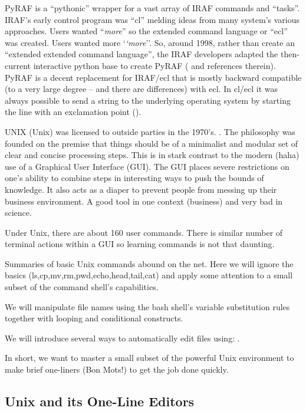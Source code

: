 PyRAF is a ``pythonic'' wrapper for a vast array of IRAF commands and
``tasks''.  IRAF's early control program was ``cl'' melding ideas from
many system's various approaches.   Users
wanted ``\emph{more}'' so the extended command language or ``ecl'' was
created. Users wanted more `\emph{`more}''.  So, around 1998, rather
than create an ``extended extended command language'', the
 IRAF developers adapted the then-current
interactive python base to create PyRAF (\cite{2006hstc.conf..437G}
and references therein). PyRAF is a decent replacement for IRAF/ecl
that is mostly backward compatible (to a very large degree -- and
there are differences) with ecl. In cl/ecl it was always possible to
send a string to the underlying operating system by starting the line
with an exclamation point ({\color{verbcolor}{\verb#!#}}).

UNIX\texttrademark\; (Unix) was licensed to outside parties in the 1970's.
. The philosophy was founded on the premise that things
should be of a minimalist and modular set of clear and concise processing
steps. This is in stark contrast to the modern (haha) use of a Graphical
User Interface (GUI). The GUI places severe restrictions on one's ability
to combine steps in interesting ways to push the bounds of knowledge. It
also acts as a diaper to prevent people from messing up their business
environment. A good tool in one context (business) and very bad in science.

Under Unix, there are about 160 user commands. There is similar number
of terminal actions within a GUI so learning commands is not that daunting.

Summaries of basic Unix commands abound on the net. Here we will
ignore the basics (ls,cp,mv,rm,pwd,echo,head,tail,cat) and apply
some attention to a small subset of the {\color{verbcolor}{\verb#bash#}}
command shell's capabilities. 

We will manipulate file names using the bash shell's variable
substitution rules together with looping and conditional constructs.

We will introduce several ways to automatically edit files using:
{\color{verbcolor}{\verb#sed,awk and vi#}}. 

In short, we want to master a small subset of the powerful Unix environment
to make brief one-liners (Bon Mots!) to get the job done quickly.

\subsection{Unix and its One-Line Editors}

